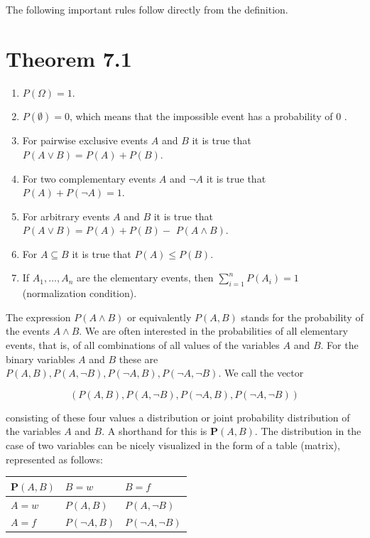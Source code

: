 \documentclass[10pt]{article}
\begin{document}
The following important rules follow directly from the definition.

\section*{Theorem 7.1}
\begin{enumerate}
  \item $P(\Omega)=1$.
  \item $P(\emptyset)=0$, which means that the impossible event has a probability of 0 .
  \item For pairwise exclusive events $A$ and $B$ it is true that $P(A \vee B)=P(A)+P(B)$.
  \item For two complementary events $A$ and $\neg A$ it is true that $P(A)+P(\neg A)=1$.
  \item For arbitrary events $A$ and $B$ it is true that $P(A \vee B)=P(A)+P(B)-$ $P(A \wedge B)$.
  \item For $A \subseteq B$ it is true that $P(A) \leq P(B)$.
  \item If $A_{1}, \ldots, A_{n}$ are the elementary events, then $\sum_{i=1}^{n} P\left(A_{i}\right)=1$ (normalization condition).
\end{enumerate}

The expression $P(A \wedge B)$ or equivalently $P(A, B)$ stands for the probability of the events $A \wedge B$. We are often interested in the probabilities of all elementary events, that is, of all combinations of all values of the variables $A$ and $B$. For the binary variables $A$ and $B$ these are $P(A, B), P(A, \neg B), P(\neg A, B), P(\neg A, \neg B)$. We call the vector

$$
(P(A, B), P(A, \neg B), P(\neg A, B), P(\neg A, \neg B))
$$

consisting of these four values a distribution or joint probability distribution of the variables $A$ and $B$. A shorthand for this is $\boldsymbol{P}(A, B)$. The distribution in the case of two variables can be nicely visualized in the form of a table (matrix), represented as follows:

\begin{center}
\begin{tabular}{lll}
\hline
$\boldsymbol{P}(A, B)$ & $B=w$ & $B=f$ \\
\hline
$A=w$ & $P(A, B)$ & $P(A, \neg B)$ \\
\hline
$A=f$ & $P(\neg A, B)$ & $P(\neg A, \neg B)$ \\
\hline
\end{tabular}
\end{center}
\end{document}
